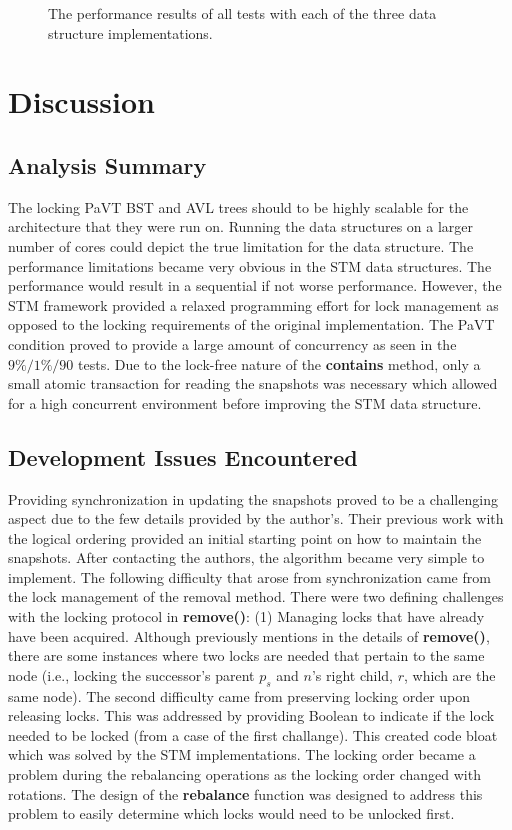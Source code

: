 \documentclass[conference]{IEEEtran}
\theoremstyle{definition}
\theoremstyle{theorem}
\begin{document}
\begin{figure}[t]
\begin{minipage}{0.33\textwidth}
\end{minipage}
\label{fig:data}
\caption{The performance results of all tests with each of the three data structure implementations.}
\end{figure}%

\section{Discussion}
\subsection{Analysis Summary}
The locking PaVT BST and AVL trees should to be highly scalable for the architecture that they were run on. Running the data structures on a larger number of cores could depict the true limitation for the data structure. The performance limitations became very obvious in the STM data structures. The performance would result in a sequential if not worse performance. However, the STM framework provided a relaxed programming effort for lock management as opposed to the locking requirements of the original implementation. The PaVT condition proved to provide a large amount of concurrency as seen in the $9\%/1\%/90$ tests. Due to the lock-free nature of the \textbf{contains} method, only a small atomic transaction for reading the snapshots was necessary which allowed for a high concurrent environment before improving the STM data structure. 

\subsection{Development Issues Encountered}
Providing synchronization in updating the snapshots proved to be a challenging aspect due to the few details provided by the author's. Their previous work with the logical ordering provided an initial starting point on how to maintain the snapshots. After contacting the authors, the algorithm became very simple to implement. The following difficulty that arose from synchronization came from the lock management of the removal method. There were two defining challenges with the locking protocol in \textbf{remove()}: (1) Managing locks that have already have been acquired. Although previously mentions in the details of \textbf{remove()}, there are some instances where two locks are needed that pertain to the same node (i.e., locking the successor's parent $p_s$ and $n$'s right child, $r$, which are the same node). The second difficulty came from preserving locking order upon releasing locks. This was addressed by providing Boolean to indicate if the lock needed to be locked (from a case of the first challange). This created code bloat which was solved by the STM implementations. The locking order became a problem during the rebalancing operations as the locking order changed with rotations. The design of the \textbf{rebalance} function was designed to address this problem to easily determine which locks would need to be unlocked first.
\end{document}
